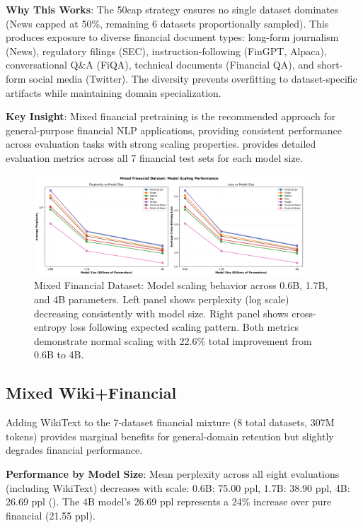 \textbf{Why This Works}: The 50cap strategy ensures no single dataset dominates (News capped at 50\%, remaining 6 datasets proportionally sampled). This produces exposure to diverse financial document types: long-form journalism (News), regulatory filings (SEC), instruction-following (FinGPT, Alpaca), conversational Q\&A (FiQA), technical documents (Financial QA), and short-form social media (Twitter). The diversity prevents overfitting to dataset-specific artifacts while maintaining domain specialization.

\textbf{Key Insight}: Mixed financial pretraining is the recommended approach for general-purpose financial NLP applications, providing consistent performance across evaluation tasks with strong scaling properties.  provides detailed evaluation metrics across all 7 financial test sets for each model size.

\begin{figure}[h]
\centering
\includegraphics[width=0.9\textwidth]{figures/scaling_mixed_financial.png}
\caption[Mixed Financial Dataset: Scaling Behavior]{Mixed Financial Dataset: Model scaling behavior across 0.6B, 1.7B, and 4B parameters. Left panel shows perplexity (log scale) decreasing consistently with model size. Right panel shows cross-entropy loss following expected scaling pattern. Both metrics demonstrate normal scaling with 22.6\% total improvement from 0.6B to 4B.}
\label{fig:scaling_mixed_financial}
\end{figure}



\subsection{Mixed Wiki+Financial}

Adding WikiText to the 7-dataset financial mixture (8 total datasets, 307M tokens) provides marginal benefits for general-domain retention but slightly degrades financial performance.

\textbf{Performance by Model Size}: Mean perplexity across all eight evaluations (including WikiText) decreases with scale: 0.6B: 75.00 ppl, 1.7B: 38.90 ppl, 4B: 26.69 ppl (). The 4B model's 26.69 ppl represents a 24\% increase over pure financial (21.55 ppl).

